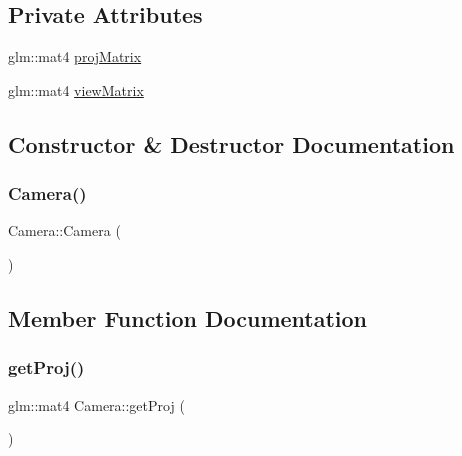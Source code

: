 \subsection*{Private Attributes}
\begin{DoxyCompactItemize}
\item 
glm\+::mat4 \hyperlink{classtmsengine_1_1_camera_aa6eba47f4e820c221fb5427b33af028b}{proj\+Matrix}
\item 
glm\+::mat4 \hyperlink{classtmsengine_1_1_camera_a6515cd508e4019fab5dfde9471b97b8f}{view\+Matrix}
\end{DoxyCompactItemize}


\subsection{Constructor \& Destructor Documentation}
\mbox{\label{classtmsengine_1_1_camera_a01f94c3543f56ede7af49dc778f19331}} 
\subsubsection{\texorpdfstring{Camera()}{Camera()}}
{\footnotesize\ttfamily Camera\+::\+Camera (\begin{DoxyParamCaption}{ }\end{DoxyParamCaption})}



\subsection{Member Function Documentation}
\mbox{\label{classtmsengine_1_1_camera_a9825b8479b94c3ced71f3e4810b66268}} 
\subsubsection{\texorpdfstring{get\+Proj()}{getProj()}}
{\footnotesize\ttfamily glm\+::mat4 Camera\+::get\+Proj (\begin{DoxyParamCaption}{ }\end{DoxyParamCaption})}

\mbox{\label{classtmsengine_1_1_camera_a9fd979b84ae4959a77a85090976137db}} 
